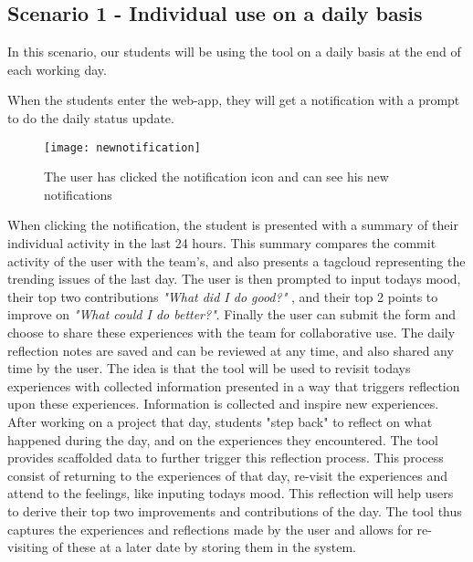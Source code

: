 \subsection{Scenario 1 - Individual use on a daily basis}
\label{scenario1}
In this scenario, our students will be using the tool on a daily basis at the end of each working day.

 When the students enter the web-app, they will get a notification with a prompt to do the daily status update.

\begin{figure}[h!]
\label{newnotification}
\centering
	\texttt{[image: newnotification]}
\caption{The user has clicked the notification icon and can see his new notifications}
\end{figure}

  When clicking the notification, the student is presented with a summary of their individual activity in the last 24 hours.
  This summary compares the commit activity of the user with the team's, and also presents a tagcloud representing the trending issues of the last day. The user is then prompted to input todays mood, their top two contributions \emph{"What did I do good?"} , and their top 2 points to improve on \emph{"What could I do better?"}. Finally the user can submit the form and choose to share these experiences with the team for collaborative use. The daily reflection notes are saved and can be reviewed at any time, and also shared any time by the user. The idea is that the tool will be used to revisit todays experiences with collected information presented in a way that triggers reflection upon these experiences. Information is collected and inspire new experiences. After working on a project that day, students "step back" to reflect on what happened during the day, and on the experiences they encountered. The tool provides scaffolded data to further trigger this reflection process. This process consist of returning to the experiences of that day, re-visit the experiences and attend to the feelings, like inputing todays mood. This reflection will help users to derive their top two improvements and contributions of the day\cite{Krogstie2011}. The tool thus captures the experiences and reflections made by the user and allows for re-visiting of these at a later date by storing them in the system. 

